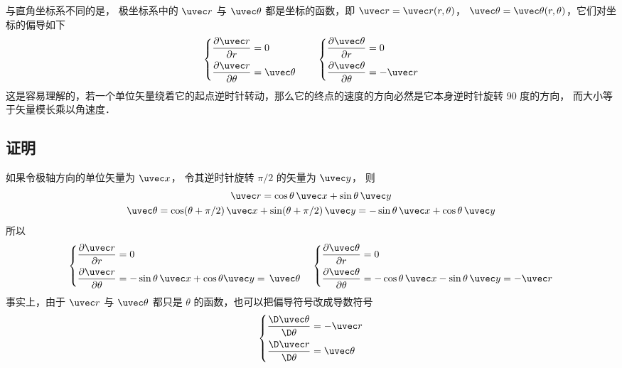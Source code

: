 

与直角坐标系不同的是， 极坐标系中的 $\uvec r$ 与 $\uvec \theta $ 都是坐标的函数，即 $\uvec r = \uvec r (r,\theta)$， $\uvec \theta  = \uvec \theta (r,\theta)$，它们对坐标的偏导如下
\begin{equation}
\left\{ \begin{aligned}
\frac{{\partial \uvec r}}{{\partial r}} &= 0\\
\frac{{\partial \uvec r}}{{\partial \theta }} &= \uvec \theta 
\end{aligned} \right.
\qquad
\left\{ \begin{aligned}
\frac{{\partial \uvec \theta }}{{\partial r}} &= 0\\
\frac{{\partial \uvec \theta }}{{\partial \theta }} &=  - \uvec r
\end{aligned} \right.
\end{equation}
这是容易理解的，若一个单位矢量绕着它的起点逆时针转动，那么它的终点的速度的方向必然是它本身逆时针旋转 90 度的方向， 而大小等于矢量模长乘以角速度．
\subsection{证明}
如果令极轴方向的单位矢量为 $\uvec x$， 令其逆时针旋转 $\pi/2$ 的矢量为 $\uvec y$， 则
\begin{gather}
\uvec r = \cos \theta \,\uvec x + \sin \theta \,\uvec y\\
\uvec \theta  = \cos (\theta +\pi/2)\,\uvec x + \sin (\theta +\pi/2)\,\uvec y
=  - \sin \theta \,\uvec x + \cos \theta \,\uvec y
\end{gather} 
所以
\begin{equation}
\left\{ \begin{aligned}
\frac{{\partial \uvec r}}{{\partial r}} &= 0\\
\frac{{\partial \uvec r}}{{\partial \theta }} &=  - \sin \theta \,\uvec x + \cos \theta \uvec y = \,\uvec \theta 
\end{aligned} \right.
\quad
\left\{ \begin{aligned}
\frac{{\partial \uvec \theta }}{{\partial r}} &= 0\\
\frac{{\partial \uvec \theta }}{{\partial \theta }} &=  - \cos \theta \,\uvec x - \sin \theta \,\uvec y =  - \uvec r
\end{aligned} \right.
\end{equation}  
事实上，由于 $\uvec r$ 与 $\uvec \theta $ 都只是 $\theta$ 的函数，也可以把偏导符号改成导数符号
 \begin{equation}
\left\{ \begin{aligned}
\frac{{\D \uvec \theta }}{{\D \theta }} &=  - \uvec r\\
\frac{{\D \uvec r}}{{\D \theta }} &= \uvec \theta 
\end{aligned} \right.
\end{equation}
 
 
 
 
 
 
 
 
 
 
 
 
 
 
 
 
 
 
 
 
 
 
 
 
 
 